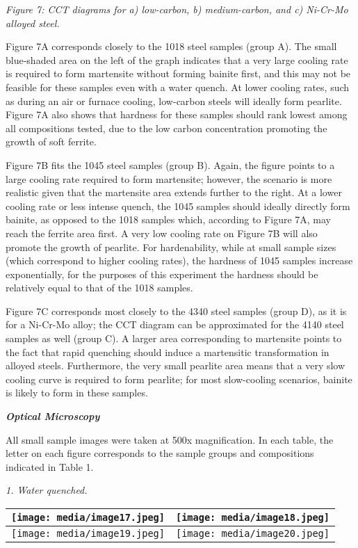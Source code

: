 \documentclass[]{article}
\begin{document}
\emph{Figure 7: CCT diagrams for a) low-carbon, b) medium-carbon, and c)
Ni-Cr-Mo alloyed steel.}

Figure 7A corresponds closely to the 1018 steel samples (group A). The
small blue-shaded area on the left of the graph indicates that a very
large cooling rate is required to form martensite without forming
bainite first, and this may not be feasible for these samples even with
a water quench. At lower cooling rates, such as during an air or furnace
cooling, low-carbon steels will ideally form pearlite. Figure 7A also
shows that hardness for these samples should rank lowest among all
compositions tested, due to the low carbon concentration promoting the
growth of soft ferrite.

Figure 7B fits the 1045 steel samples (group B). Again, the figure
points to a large cooling rate required to form martensite; however, the
scenario is more realistic given that the martensite area extends
further to the right. At a lower cooling rate or less intense quench,
the 1045 samples should ideally directly form bainite, as opposed to the
1018 samples which, according to Figure 7A, may reach the ferrite area
first. A very low cooling rate on Figure 7B will also promote the growth
of pearlite. For hardenability, while at small sample sizes (which
correspond to higher cooling rates), the hardness of 1045 samples
increase exponentially, for the purposes of this experiment the hardness
should be relatively equal to that of the 1018 samples.

Figure 7C corresponds most closely to the 4340 steel samples (group D),
as it is for a Ni-Cr-Mo alloy; the CCT diagram can be approximated for
the 4140 steel samples as well (group C). A larger area corresponding to
martensite points to the fact that rapid quenching should induce a
martensitic transformation in alloyed steels. Furthermore, the very
small pearlite area means that a very slow cooling curve is required to
form pearlite; for most slow-cooling scenarios, bainite is likely to
form in these samples.

\emph{\textbf{Optical Microscopy}}

All small sample images were taken at 500x magnification. In each table,
the letter on each figure corresponds to the sample groups and
compositions indicated in Table 1.

\emph{1. Water quenched.}

\begin{longtable}[]{@{}ll@{}}
\toprule
\texttt{[image: media/image17.jpeg]} &
\texttt{[image: media/image18.jpeg]}\tabularnewline
\midrule
\endhead
\texttt{[image: media/image19.jpeg]} &
\texttt{[image: media/image20.jpeg]}\tabularnewline
\bottomrule
\end{longtable}
\end{document}
